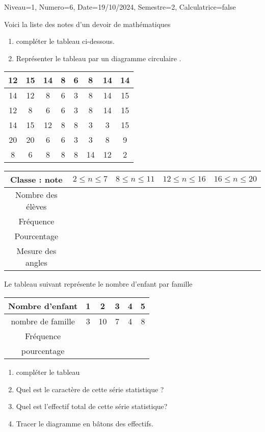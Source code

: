 \documentclass[a4paper,12pt]{article}
\begin{document}
\begin{Maquette}[DS]{Niveau=1, Numero=6, Date=19/10/2024, Semestre=2, Calculatrice=false}


\begin{exercice}
\begin{minipage}{.6\linewidth}
Voici la liste des notes d'un devoir de mathématiques 
\begin{enumerate}
\item compléter le tableau ci-dessous.
\item Représenter le tableau par un diagramme circulaire .
\end{enumerate}
\end{minipage}
\begin{tabular}{c|c|c|c|c|c|c|c}
12 & 15 & 14 & 8 & 6 & 8 & 14 & 14	 \\ 
\hline 
14 & 12 & 8 & 6 & 3 & 8 & 14 & 15	 \\ 
\hline 
12 & 8 & 6 & 6 & 3 & 8 & 14 & 15	 \\ 
\hline 
14 & 15 & 12 & 8 & 8 & 3 & 3 & 15 \\ 
\hline 
20 & 20 & 6 & 6 & 3 & 3 & 8 & 9 \\ 
\hline 
8 & 6 & 8 & 8 & 8 & 14 & 12 & 2 \\ 
\end{tabular} 

\begin{tabular}{|c|c|c|c|c|}
\hline 
Classe : note  & $2\leq n \leq 7$ & $8\leq n \leq 11$ &$12\leq n \leq 16$ & $16\leq n \leq 20$ \\ 
\hline 
Nombre des élèves &  &  &  &  \\ 
\hline 
Fréquence&  &  &  &  \\ 
\hline 
Pourcentage &  &  &  &  \\ 
\hline 
Mesure des angles &  &  &  &  \\ 
\hline 
\end{tabular} 
\end{exercice}

\begin{exercice}
Le tableau suivant représente le nombre d'enfant par famille

\begin{tabular}{|c|c|c|c|c|c|}
\hline 
Nombre d'enfant & 1 & 2 & 3 & 4 & 5 \\ 
\hline 
nombre de famille & 3 & 10 & 7 & 4 & 8 \\ 
\hline 
Fréquence  &  &  &  &  &  \\ 
\hline 
pourcentage &  &  &  &  &  \\ 
\hline 
\end{tabular} 
\begin{enumerate}
\item compléter le tableau
\item Quel est le caractère de cette série statistique ?
\item Quel est l'effectif total de cette série statistique?
\item Tracer le diagramme en bâtons des effectifs.
\end{enumerate}
\end{exercice}



\end{Maquette}
\end{document}
